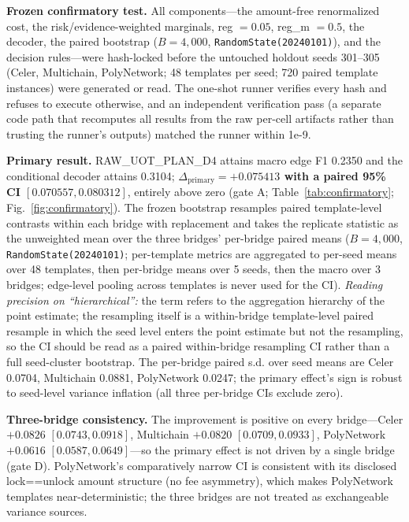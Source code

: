 \textbf{Frozen confirmatory test.} All components---the amount-free renormalized cost, the risk/evidence-weighted marginals, reg $=0.05$, reg\_m $=0.5$, the decoder, the paired bootstrap ($B=4{,}000$, \texttt{RandomState(20240101)}), and the decision rules---were hash-locked before the untouched holdout seeds 301--305 (Celer, Multichain, PolyNetwork; 48 templates per seed; 720 paired template instances) were generated or read. The one-shot runner verifies every hash and refuses to execute otherwise, and an independent verification pass (a separate code path that recomputes all results from the raw per-cell artifacts rather than trusting the runner's outputs) matched the runner within 1e-9.

\textbf{Primary result.} RAW\_UOT\_PLAN\_D4 attains macro edge F1 0.2350 and the conditional decoder attains 0.3104; \textbf{$\Delta_{\mathrm{primary}} = +0.075413$ with a paired 95\% CI $[0.070557, 0.080312]$}, entirely above zero (gate A; Table~\ref{tab:confirmatory}; Fig.~\ref{fig:confirmatory}). The frozen bootstrap resamples paired template-level contrasts within each bridge with replacement and takes the replicate statistic as the unweighted mean over the three bridges' per-bridge paired means ($B=4{,}000$, \texttt{RandomState(20240101)}; per-template metrics are aggregated to per-seed means over 48 templates, then per-bridge means over 5 seeds, then the macro over 3 bridges; edge-level pooling across templates is never used for the CI). \emph{Reading precision on ``hierarchical'':} the term refers to the aggregation hierarchy of the point estimate; the resampling itself is a within-bridge template-level paired resample in which the seed level enters the point estimate but not the resampling, so the CI should be read as a paired within-bridge resampling CI rather than a full seed-cluster bootstrap. The per-bridge paired s.d. over seed means are Celer 0.0704, Multichain 0.0881, PolyNetwork 0.0247; the primary effect's sign is robust to seed-level variance inflation (all three per-bridge CIs exclude zero).

\textbf{Three-bridge consistency.} The improvement is positive on every bridge---Celer $+0.0826$ $[0.0743, 0.0918]$, Multichain $+0.0820$ $[0.0709, 0.0933]$, PolyNetwork $+0.0616$ $[0.0587, 0.0649]$---so the primary effect is not driven by a single bridge (gate D). PolyNetwork's comparatively narrow CI is consistent with its disclosed lock==unlock amount structure (no fee asymmetry), which makes PolyNetwork templates near-deterministic; the three bridges are not treated as exchangeable variance sources.

